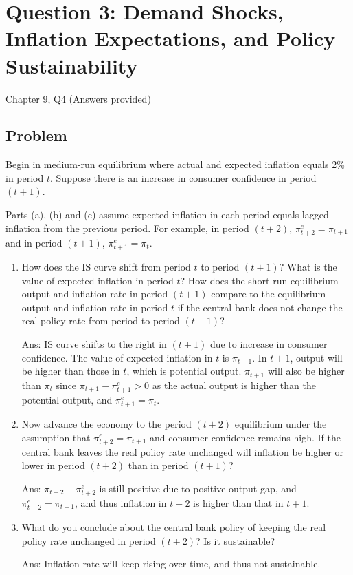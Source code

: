 \documentclass[12pt]{article}
\begin{document}
\section{Question 3: Demand Shocks, Inflation Expectations, and Policy Sustainability}

\noindent
Chapter 9, Q4 (Answers provided)

\subsection{Problem}
Begin in medium-run equilibrium where actual and expected inflation equals 2\% in period \(t\). Suppose there is an increase in consumer confidence in period \((t+1)\).

Parts (a), (b) and (c) assume expected inflation in each period equals lagged inflation from the previous period. For example, in period \((t+2)\), \(\pi^e_{t+2}=\pi_{t+1}\) and in period \((t+1)\), \(\pi^e_{t+1}=\pi_t\).

\begin{enumerate}[label=(\alph*)]
    \item How does the IS curve shift from period \(t\) to period \((t+1)\)? What is the value of expected inflation in period \(t\)? How does the short-run equilibrium output and inflation rate in period \((t+1)\) compare to the equilibrium output and inflation rate in period \(t\) if the central bank does not change the real policy rate from period to period \((t+1)\)?

    Ans: IS curve shifts to the right in \((t+1)\) due to increase in consumer confidence. The value of expected inflation in \(t\) is \(\pi_{t-1}\). In \(t+1\), output will be higher than those in \(t\), which is potential output. \(\pi_{t+1}\) will also be higher than \(\pi_t\) since \(\pi_{t+1}-\pi^e_{t+1}>0\) as the actual output is higher than the potential output, and \(\pi^e_{t+1}=\pi_t\).

    \item Now advance the economy to the period \((t+2)\) equilibrium under the assumption that \(\pi^e_{t+2}=\pi_{t+1}\) and consumer confidence remains high. If the central bank leaves the real policy rate unchanged will inflation be higher or lower in period \((t+2)\) than in period \((t+1)\)?

    Ans: \(\pi_{t+2}-\pi^e_{t+2}\) is still positive due to positive output gap, and \(\pi^e_{t+2}=\pi_{t+1}\), and thus inflation in \(t+2\) is higher than that in \(t+1\).

    \item What do you conclude about the central bank policy of keeping the real policy rate unchanged in period \((t+2)\)? Is it sustainable?

    Ans: Inflation rate will keep rising over time, and thus not sustainable.
\end{enumerate}
\end{document}
